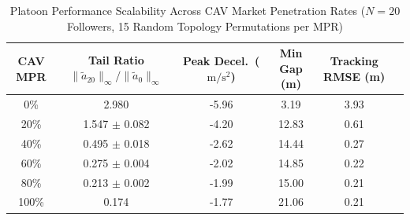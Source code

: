 \begin{table}[t]
\centering
\caption{Platoon Performance Scalability Across CAV Market Penetration Rates ($N = 20$ Followers, 15 Random Topology Permutations per MPR)}
\label{tab:mpr_scalability}
\begin{tabular}{cccccc}
\toprule
CAV MPR & Tail Ratio $\|\tilde{a}_{20}\|_\infty / \|\tilde{a}_0\|_\infty$ & Peak Decel.\ ($\mathrm{m/s^2}$) & Min Gap (m) & Tracking RMSE (m) \\
\midrule
0\% & 2.980 & -5.96 & 3.19 & 3.93 \\
20\% & 1.547 $\pm$ 0.082 & -4.20 & 12.83 & 0.61 \\
40\% & 0.495 $\pm$ 0.018 & -2.62 & 14.44 & 0.27 \\
60\% & 0.275 $\pm$ 0.004 & -2.02 & 14.85 & 0.22 \\
80\% & 0.213 $\pm$ 0.002 & -1.99 & 15.00 & 0.21 \\
100\% & 0.174 & -1.77 & 21.06 & 0.21 \\
\bottomrule
\end{tabular}
\end{table}
